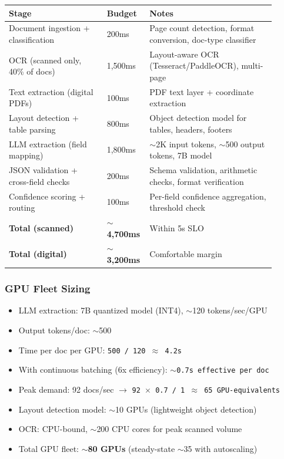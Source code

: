 \begin{tabular}{|p{0.35\linewidth}|p{0.10\linewidth}|p{0.45\linewidth}|}
\hline
\textbf{Stage} & \textbf{Budget} & \textbf{Notes} \\
\hline
Document ingestion + classification & 200ms & Page count detection, format conversion, doc-type classifier \\
\hline
OCR (scanned only, 40\% of docs) & 1,500ms & Layout-aware OCR (Tesseract/PaddleOCR), multi-page \\
\hline
Text extraction (digital PDFs) & 100ms & PDF text layer + coordinate extraction \\
\hline
Layout detection + table parsing & 800ms & Object detection model for tables, headers, footers \\
\hline
LLM extraction (field mapping) & 1,800ms & $\sim$2K input tokens, $\sim$500 output tokens, 7B model \\
\hline
JSON validation + cross-field checks & 200ms & Schema validation, arithmetic checks, format verification \\
\hline
Confidence scoring + routing & 100ms & Per-field confidence aggregation, threshold check \\
\hline
\textbf{Total (scanned)} & \textbf{$\sim$4,700ms} & Within 5s SLO \\
\hline
\textbf{Total (digital)} & \textbf{$\sim$3,200ms} & Comfortable margin \\
\hline
\end{tabular}

\subsubsection*{GPU Fleet Sizing}

\begin{itemize}
  \item LLM extraction: 7B quantized model (INT4), $\sim$120 tokens/sec/GPU
  \item Output tokens/doc: $\sim$500
  \item Time per doc per GPU: \texttt{500 / 120 $\approx$ 4.2s}
  \item With continuous batching (6x efficiency): \texttt{$\sim$0.7s effective per doc}
  \item Peak demand: 92 docs/sec $\rightarrow$ \texttt{92 $\times$ 0.7 / 1 $\approx$ 65 GPU-equivalents}
  \item Layout detection model: $\sim$10 GPUs (lightweight object detection)
  \item OCR: CPU-bound, $\sim$200 CPU cores for peak scanned volume
  \item Total GPU fleet: \textbf{$\sim$80 GPUs} (steady-state $\sim$35 with autoscaling)
\end{itemize}

